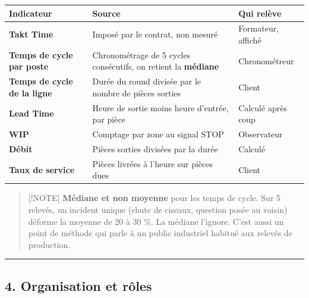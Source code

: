 \documentclass[
]{article}
\newcounter{none} %
\begin{document}
{\def\LTcaptype{none} %
\begin{longtable}[]{@{}
  >{\raggedright\arraybackslash}p{}
  >{\raggedright\arraybackslash}p{}
  >{\raggedright\arraybackslash}p{}@{}}
\toprule\noalign{}
\begin{minipage}[b]{\linewidth}\raggedright
Indicateur
\end{minipage} & \begin{minipage}[b]{\linewidth}\raggedright
Source
\end{minipage} & \begin{minipage}[b]{\linewidth}\raggedright
Qui relève
\end{minipage} \\
\midrule\noalign{}
\endhead
\bottomrule\noalign{}
\endlastfoot
\textbf{Takt Time} & Imposé par le contrat, non mesuré & Formateur,
affiché \\
\textbf{Temps de cycle par poste} & Chronométrage de 5 cycles
consécutifs, on retient la \textbf{médiane} & Chronométreur \\
\textbf{Temps de cycle de la ligne} & Durée du round divisée par le
nombre de pièces sorties & Client \\
\textbf{Lead Time} & Heure de sortie moins heure d'entrée, par pièce &
Calculé après coup \\
\textbf{WIP} & Comptage par zone au signal STOP & Observateur \\
\textbf{Débit} & Pièces sorties divisées par la durée & Calculé \\
\textbf{Taux de service} & Pièces livrées à l'heure sur pièces dues &
Client \\
\end{longtable}
}

\begin{quote}
{[}!NOTE{]} \textbf{Médiane et non moyenne} pour les temps de cycle. Sur
5 relevés, un incident unique (chute de ciseaux, question posée au
voisin) déforme la moyenne de 20 à 30 \%. La médiane l'ignore. C'est
aussi un point de méthode qui parle à un public industriel habitué aux
relevés de production.
\end{quote}

\begin{center}\rule{0.5\linewidth}{0.5pt}\end{center}

\subsection{4. Organisation et rôles}\label{organisation-et-ruxf4les}
\end{document}
